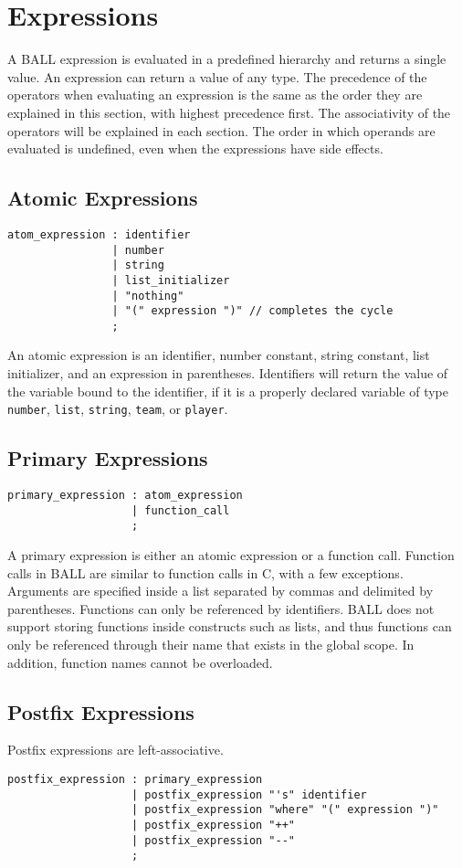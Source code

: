 
\section{Expressions}
A BALL expression is evaluated in a predefined hierarchy and returns a single value. An expression can return a value of any type. The precedence of the operators when evaluating an expression is the same as the order they are explained in this section, with highest precedence first. The associativity of the operators will be explained in each section. The order in which operands are evaluated is undefined, even when the expressions have side effects.

\subsection{Atomic Expressions}
\begin{verbatim}
atom_expression : identifier
                | number
                | string
                | list_initializer
                | "nothing"
                | "(" expression ")" // completes the cycle
                ;
\end{verbatim} 

An atomic expression is an identifier, number constant, string
constant, list initializer, and an expression in
parentheses. Identifiers will return the value of the variable bound
to the identifier, if it is a properly declared variable of type
\texttt{number}, \texttt{list}, \texttt{string}, \texttt{team}, or
\texttt{player}.

\subsection{Primary Expressions}
\begin{verbatim}
primary_expression : atom_expression
                   | function_call
                   ;
\end{verbatim} 
A primary expression is either an atomic expression or a function
call. Function calls in BALL are similar to function calls in C, with
a few exceptions.  Arguments are specified inside a list separated by
commas and delimited by parentheses.  Functions can only be referenced
by identifiers. BALL does not support storing functions inside
constructs such as lists, and thus functions can only be referenced
through their name that exists in the global scope. In addition,
function names cannot be overloaded.

\subsection{Postfix Expressions}
Postfix expressions are left-associative.
\begin{verbatim}
postfix_expression : primary_expression
                   | postfix_expression "'s" identifier
                   | postfix_expression "where" "(" expression ")"
                   | postfix_expression "++"
                   | postfix_expression "--"
                   ;
\end{verbatim}

